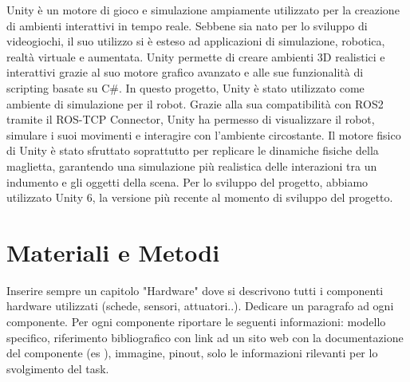 \documentclass[11pt]{report}
\begin{document}
Unity è un motore di gioco e simulazione ampiamente utilizzato per la creazione di ambienti interattivi in tempo reale. Sebbene sia nato per lo sviluppo di videogiochi, il suo utilizzo si è esteso ad applicazioni di simulazione, robotica, realtà virtuale e aumentata. Unity permette di creare ambienti 3D realistici e interattivi grazie al suo motore grafico avanzato e alle sue funzionalità di scripting basate su C\#.
In questo progetto, Unity è stato utilizzato come ambiente di simulazione per il robot. Grazie alla sua compatibilità con ROS2 tramite il ROS-TCP Connector, Unity ha permesso di visualizzare il robot, simulare i suoi movimenti e interagire con l'ambiente circostante. Il motore fisico di Unity è stato sfruttato soprattutto per replicare le dinamiche fisiche della maglietta, garantendo una simulazione più realistica delle interazioni tra un indumento e gli oggetti della scena.
Per lo sviluppo del progetto, abbiamo utilizzato Unity 6, la versione più recente al momento di sviluppo del progetto.



\newpage
\chapter{Materiali e Metodi}
\label{Materiali e Metodi}
Inserire sempre un capitolo "Hardware" dove si descrivono tutti i componenti hardware utilizzati (schede, sensori, attuatori..). Dedicare un paragrafo ad ogni componente. Per ogni componente riportare le seguenti informazioni: modello specifico, riferimento bibliografico con link ad un sito web con la documentazione del componente (es \cite{DCdriver}), immagine, pinout, solo le informazioni rilevanti per lo svolgimento del task.
\end{document}
